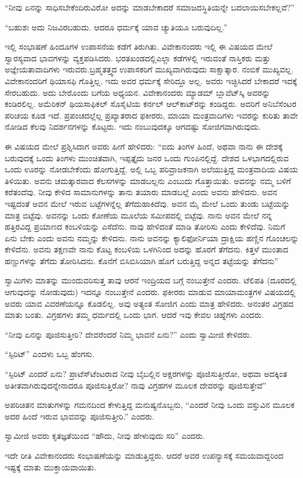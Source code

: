 “ನೀವು ಏನನ್ನು ಸಾಧಿಸಬೇಕೆಂದಿರುವಿರೋ ಅದನ್ನು ಮಾಡಬೇಕಾದರೆ ಸಮಾಜದ\break ಸ್ಥಿತಿಯನ್ನೇ ಬದಲಾಯಿಸಬೇಕಲ್ಲವೆ?”

“ಬಹುಶಃ ಅದು ನಿಜವಿರಬಹುದು. ಆದರೂ ಧರ್ಮಕ್ಕೆ ಯಾವ ಚ್ಯುತಿಯೂ ಬರುವುದಿಲ್ಲ.”

ಇಲ್ಲಿ ಸಂಭಾಷಣೆ ಹಿಂದೂಗಳ ಉಪಾಸನೆಯ ಕಡೆಗೆ ತಿರುಗಿತು. ವಿವೇಕಾನಂದರು ಇಲ್ಲಿ ಈ ವಿಷಯದ ಮೇಲೆ ಸ್ವಾರಸ್ಯವಾದ ಭಾವಗಳನ್ನು ವ್ಯಕ್ತಪಡಿಸಿದರು. ಭರತಖಂಡದಲ್ಲಿ\break ಎಲ್ಲಾ ಕಡೆಗಳಲ್ಲಿ ಇರುವಂತೆ ನಾಸ್ತಿಕರು ಮತ್ತು ಅಜ್ಞೇಯತಾವಾದಿಗಳು ಇರುವರು.\break ಬ್ರಹ್ಮತತ್ತ್ವದ ಉಪಾಸಕರಿಗೆ ಮುಖ್ಯವಾಗಿರುವುದು ಸಾಕ್ಷಾತ್ಕಾರ. ನಂಬಿಕೆ ಮುಖ್ಯವಲ್ಲ. ವಿವೇಕಾನಂದರಿಗೆ ಥಿಯಾಸಫಿ ಗೊತ್ತಿಲ್ಲ. ಇದು ಅವರ ಧರ್ಮಕ್ಕೆ ಸೇರಿದ್ದೂ ಅಲ್ಲ. ಅವರು ಇಚ್ಛಿಸಿದರೆ ಬೇಕಾದರೆ ಇದಕ್ಕೆ ಸೇರಬಹುದು. ಅದು ಬೇರೊಂದು ಬಗೆಯ ಅಧ್ಯಯನ. ವಿವೇಕಾನಂದರು ಮ್ಯಾಡಮ್​ ಬ್ಲಾವೆಟ್​ಸ್ಕಿ ಅವರನ್ನು ಕಂಡಿರಲಿಲ್ಲ. ಅಮೆರಿಕನ್​ ಥಿಯಸಾಫಿಕಲ್​ ಸೊಸೈಟಿಯ ಕರ್ನಲ್​ ಆಲ್​ಕಾಟ್​ರನ್ನು ಕಂಡಿದ್ದರು. ಅವರಿಗೆ ಅನಿಬೆಸೆಂಟರ ಪರಿಚಯ ಕೂಡ ಇದೆ. ಪ್ರಪಂಚದಲ್ಲೆಲ್ಲ ಪ್ರಖ್ಯಾತರಾದ ಫಕೀರರು, ಮಾಯಾ ಮಂತ್ರವಾದಿಗಳು ಇವರನ್ನು ಕುರಿತು ತಾವೇ ನೋಡಿದ ಕೆಲವು ನಿದರ್ಶನಗಳನ್ನು ಕೊಟ್ಟರು. ಇದು ನಂಬುವುದಕ್ಕೂ ಆಗದಷ್ಟು ಸೋಜಿಗವಾಗಿರುವುದು.

ಈ ವಿಷಯದ ಮೇಲೆ ಪ್ರಶ್ನಿಸಿದಾಗ ಅವರು ಹೀಗೆ ಹೇಳಿದರು: “ಐದು ತಿಂಗಳ ಹಿಂದೆ, ಅಥವಾ ನಾನು ಈ ದೇಶಕ್ಕೆ ಬರುವುದಕ್ಕೆ ಒಂದು ತಿಂಗಳು ಮುಂಚಿತವಾಗಿ, ಇಪ್ಪತ್ತೈದು ಜನರ ಒಂದು ಗುಂಪಿನಲ್ಲಿದ್ದೆ. ದೇಶದ ಒಳಭಾಗದಲ್ಲಿರುವ ಒಂದು ಊರನ್ನು ನೋಡಬೇಕೆಂದು ಹೋಗುತ್ತಿದ್ದೆ. ಅಲ್ಲಿ ಒಬ್ಬ ಪರಿವ್ರಾಜಕನಾಗಿ ಅಲೆಯುತ್ತಿದ್ದ ಮಂತ್ರವಾದಿಯ ವಿಷಯ ತಿಳಿಯಿತು. ಅವನು ಚಮತ್ಕಾರವಾದ ಕೆಲಸಗಳನ್ನು ಮಾಡಬಲ್ಲನು ಎಂಬುದು ಗೊತ್ತಾಯಿತು. ಅವನನ್ನು ನಮ್ಮ ಬಳಿಗೆ ಕರೆತಂದೆವು. ನೀವು ಕೇಳಿದ ಸಾಮಾನುಗಳನ್ನು ತಾನು ತಯಾರು ಮಾಡಬಲ್ಲೆ ಎಂದು ಅವನು ಹೇಳಿದನು. ಅವನ ಇಷ್ಟದಂತೆ ಅವನ ಮೇಲೆ ಇರುವ ಬಟ್ಟೆಗಳನ್ನೆಲ್ಲ ತೆಗೆದುಹಾಕಿದೆವು. ಅವನ ಮೈ ಮೇಲೆ ಒಂದು ತುಂಡು ಬಟ್ಟೆಯನ್ನು ಮಾತ್ರ ಬಿಟ್ಟೆವು. ಅವನನ್ನು ಒಂದು ಕೋಣೆಯ ಮೂಲೆಯ ಸಮೀಪದಲ್ಲಿ ಬಿಟ್ಟೆವು. ನಾನು ಅವನ ಮೇಲೆ ನನ್ನ ಹತ್ತಿರವಿದ್ದ ಪ್ರಯಾಣದ ಕಂಬಳಿಯನ್ನು ಎಸೆದೆನು. ನಾವು ಹೇಳಿದಂತೆ ಮಾಡಿ ತೋರಿಸು ಎಂದು ಕೇಳಿದೆವು. ನಿಮಗೆ ಏನು ಬೇಕು ಎಂದು ಅವನು ನಮ್ಮನ್ನು ಕೇಳಿದನು. ನಾನು ಅವನನ್ನು ಕ್ಯಾಲಿಫೋರ್ನಿಯಾ ದ್ರಾಕ್ಷಿಯ ಹಣ್ಣಿನ ಗೊಂಚಲನ್ನು ಕೇಳಿದೆನು. ಅವನು ತಕ್ಷಣವೇ ನಾನು ಕೊಟ್ಟ ಕಂಬಳಿಯ ಒಳಗಿನಿಂದ ಅದನ್ನು ಹೊರಗೆ ತೆಗೆದನು. ಕಿತ್ತಳೆ ಮುಂತಾದ ಹಣ್ಣುಗಳನ್ನು ತೆಗೆದು ತೋರಿಸಿದನು. ಕೊನೆಗೆ ಬಿಸಿಬಿಸಿಯಾಗಿ ಹೊಗೆ ಬರುತ್ತಿದ್ದ ಅನ್ನದ ತಟ್ಟೆಯನ್ನು ತೆಗೆದನು”

ಸ್ವಾಮಿಗಳು ಮಾತನ್ನು ಮುಂದುವರಿಸುತ್ತ ತಾವು ಆರನೆ ಇಂದ್ರಿಯದ ಬಗ್ಗೆ ನಂಬುತ್ತೇನೆ ಎಂದರು. ಟೆಲಿಪತಿ (ದೂರದಲ್ಲಿ ಆಗುವುದನ್ನು ನೋಡುವುದು) ಇದನ್ನೂ ನಂಬುತ್ತೇನೆ ಎಂದರು. ಫಕೀರರು ಮಾಡುವ ಮಾಯಾಮಂತ್ರಗಳ ವಿಷಯದಲ್ಲಿ ಅವರು ಯಾವ ವಿವರಣೆಯನ್ನೂ ಕೊಡಲಿಲ್ಲ. ಅವು ಅತ್ಯಂತ ಸೋಜಿಗ ಎಂದು ಮಾತ್ರ ಹೇಳಿದರು. ಅನಂತರ ವಿಗ್ರಹದ ಮಾತು ಬಂತು. ವಿಗ್ರಹಗಳು ತಮ್ಮ ಧರ್ಮದಲ್ಲಿ ಒಂದು ಭಾಗ. ಆದರೆ ಇವು ಕೇವಲ ಚಿಹ್ನೆಗಳು ಎಂದರು.

“ನೀವು ಏನನ್ನು ಪೂಜಿಸುತ್ತೀರಿ? ದೇವರೆಂದರೆ ನಿಮ್ಮ ಭಾವನೆ ಏನು?” ಎಂದು ಸ್ವಾಮೀಜಿ ಕೇಳಿದರು.

“ಸ್ಪಿರಿಟ್​” ಎಂದಳು ಒಬ್ಬ ಹೆಂಗಸು.

“ಸ್ಪಿರಿಟ್​ ಎಂದರೆ ಏನು? ಪ್ರಾಟೆಸ್​ಟೆಂಟರಾದ ನೀವು ಬೈಬಲ್ಲಿನ ಅಕ್ಷರಗಳನ್ನು ಪೂಜಿಸುತ್ತೀರೋ, ಅಥವಾ ಅದಕ್ಕಿಂತ ಅತೀತವಾಗಿರುವುದನ್ನೇನಾದರೂ ಪೂಜಿಸುತ್ತಿರೋ? ನಾವು ವಿಗ್ರಹಗಳ ಮೂಲಕ ದೇವರನ್ನು ಪೂಜಿಸುತ್ತೇವೆ”

ಅಪರಿಚಿತನ ಮಾತುಗಳನ್ನು ಗಮನದಿಂದ ಕೇಳುತ್ತಿದ್ದ ಮನುಷ್ಯನೊಬ್ಬನು, “ಎಂದರೆ ನೀವು ಒಂದು ವಸ್ತುವಿನ ಮೂಲಕ ಅದರ ಹಿಂದೆ ಇರುವ ಭಾವವನ್ನು ಪೂಜಿಸುತ್ತೀರಿ.” ಎಂದರು.

ಸ್ವಾಮೀಜಿ ಅವರು ಕೃತಜ್ಞತೆಯಿಂದ “ಹೌದು, ನೀವು ಹೇಳುವುದು ಸರಿ” ಎಂದರು.

ಇದೇ ರೀತಿ ವಿವೇಕಾನಂದರು ಸಂಭಾಷಣೆಯನ್ನು ಮಾಡುತ್ತಿದ್ದರು. ಆದರೆ ಅವರ ಉಪನ್ಯಾಸಕ್ಕೆ ಸಮಯವಾದ್ದರಿಂದ ಇಷ್ಟಕ್ಕೆ ಮಾತು ಮುಕ್ತಾಯವಾಯಿತು.

